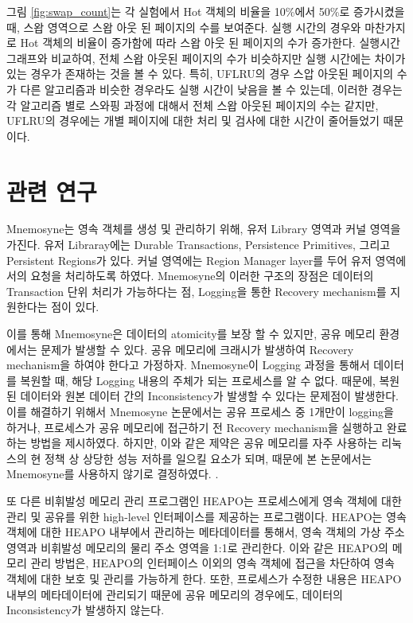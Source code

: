 \documentclass[letterpaper,twocolumn,10pt]{article}
\begin{document}
그림 \ref{fig:swap_count}는 각 실험에서 Hot 객체의 비율을 10\%에서 50\%로 증가시켰을 때, 스왑 영역으로 스왑 아웃 된 페이지의 수를 보여준다. 실행 시간의 경우와 마찬가지로 Hot 객체의 비율이 증가함에 따라 스왑 아웃 된 페이지의 수가 증가한다. 실행시간 그래프와 비교하여, 전체 스왑 아웃된 페이지의 수가 비슷하지만 실행 시간에는 차이가 있는 경우가 존재하는 것을 볼 수 있다. 특히, UFLRU의 경우 스압 아웃된 페이지의 수가 다른 알고리즘과 비슷한 경우라도 실행 시간이 낮음을 볼 수 있는데, 이러한 경우는 각 알고리즘 별로 스와핑 과정에 대해서 전체 스왑 아웃된 페이지의 수는 같지만, UFLRU의 경우에는 개별 페이지에 대한 처리 및 검사에 대한 시간이 줄어들었기 때문이다.

\section{관련 연구}

Mnemosyne는 영속 객체를 생성 및 관리하기 위해, 유저 Library 영역과 커널 영역을 가진다. 유저 Libraray에는 Durable Transactions, Persistence Primitives, 그리고 Persistent Regions가 있다. 커널 영역에는 Region Manager layer를 두어 유저 영역에서의 요청을 처리하도록 하였다. Mnemosyne의 이러한 구조의 장점은 데이터의 Transaction 단위 처리가 가능하다는 점, Logging을 통한 Recovery mechanism를 지원한다는 점이 있다. 

이를 통해 Mnemosyne은 데이터의 atomicity를 보장 할 수 있지만, 공유 메모리 환경에서는 문제가 발생할 수 있다. 공유 메모리에 크래시가 발생하여 Recovery mechanism을 하여야 한다고 가정하자. Mnemosyne이 Logging 과정을 통해서 데이터를 복원할 때, 해당 Logging 내용의 주체가 되는 프로세스를 알 수 없다. 때문에, 복원된 데이터와 원본 데이터 간의 Inconsistency가 발생할 수 있다는 문제점이 발생한다. 이를 해결하기 위해서 Mnemosyne 논문에서는 공유 프로세스 중 1개만이 logging을 하거나, 프로세스가 공유 메모리에 접근하기 전 Recovery mechanism을 실행하고 완료하는 방법을 제시하였다. 하지만, 이와 같은 제약은 공유 메모리를 자주 사용하는 리눅스의 현 정책 상 상당한 성능 저하를 일으킬 요소가 되며, 때문에 본 논문에서는 Mnemosyne를 사용하지 않기로 결정하였다. \cite{volos2011mnemosyne}.

또 다른 비휘발성 메모리 관리 프로그램인 HEAPO는 프로세스에게 영속 객체에 대한 관리 및 공유를 위한 high-level 인터페이스를 제공하는 프로그램이다. HEAPO는 영속 객체에 대한 HEAPO 내부에서 관리하는 메타데이터를 통해서, 영속 객체의 가상 주소 영역과 비휘발성 메모리의 물리 주소 영역을 1:1로 관리한다. 이와 같은 HEAPO의 메모리 관리 방법은, HEAPO의 인터페이스 이외의 영속 객체에 접근을 차단하여 영속 객체에 대한 보호 및 관리를 가능하게 한다. 또한, 프로세스가 수정한 내용은 HEAPO 내부의 메타데이터에 관리되기 때문에 공유 메모리의 경우에도, 데이터의 Inconsistency가 발생하지 않는다.
\end{document}
